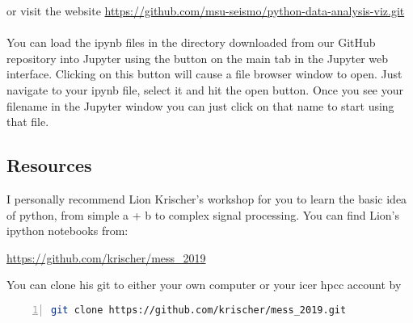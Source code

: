 \documentclass[12pt]{article}   	%
\begin{document}
or visit the website  \href{https://github.com/msu-seismo/python-data-analysis-viz.git}{https://github.com/msu-seismo/python-data-analysis-viz.git} \\\\
You can load the ipynb files in the directory downloaded from our GitHub repository into Jupyter using the
 button on the main  tab in the Jupyter web interface. Clicking on this button will
cause a file browser window to open. Just navigate to your ipynb file, select it and hit the
open button. Once you see your filename in the Jupyter window you can just click on that
name to start using that file. 

\subsection*{Resources}
I personally recommend Lion Krischer's workshop for you to learn the basic idea of python, from simple a + b to complex signal processing. You can find Lion's ipython notebooks from:

\href{https://github.com/krischer/mess_2019}{https://github.com/krischer/mess\_2019}

You can clone his git to either your own computer or your icer hpcc account by
\begin{lstlisting}[language=bash, numbers=left, numberstyle=\tiny,keywordstyle=\color{blue!70},basicstyle=\ttfamily]
git clone https://github.com/krischer/mess_2019.git
\end{lstlisting}
\end{document}
